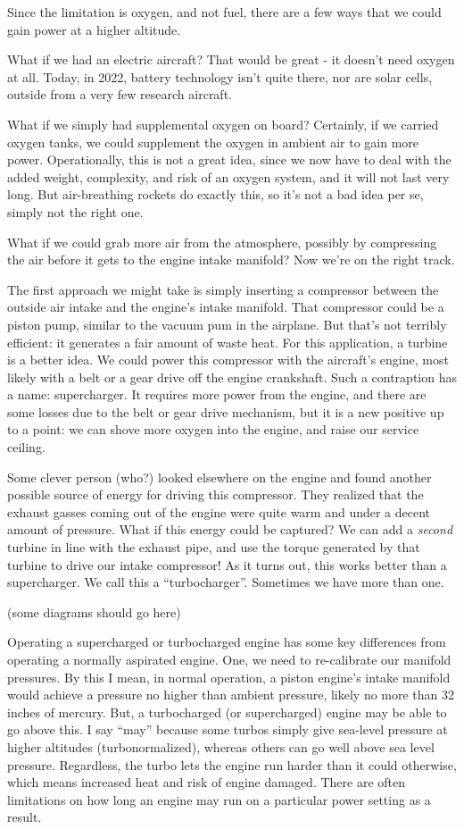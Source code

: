 Since the limitation is oxygen, and not fuel, there are a few ways that we could gain power at a higher altitude.

What if we had an electric aircraft? That would be great - it doesn't need oxygen at all. Today, in 2022, battery technology isn't quite there, nor are solar cells, outside from a very few research aircraft.

What if we simply had supplemental oxygen on board? Certainly, if we carried oxygen tanks, we could supplement the oxygen in ambient air to gain more power. Operationally, this is not a great idea, since we now have to deal with the added weight, complexity, and risk of an oxygen system, and it will not last very long. But air-breathing rockets do exactly this, so it's not a bad idea per se, simply not the right one.

What if we could grab more air from the atmosphere, possibly by compressing the air before it gets to the engine intake manifold? Now we're on the right track.

The first approach we might take is simply inserting a compressor between the outside air intake and the engine's intake manifold. That compressor could be a piston pump, similar to the vacuum pum in the airplane. But that's not terribly efficient: it generates a fair amount of waste heat. For this application, a turbine is a better idea. We could power this compressor with the aircraft's engine, most likely with a belt or a gear drive off the engine crankshaft. Such a contraption has a name: supercharger. It requires more power from the engine, and there are some losses due to the belt or gear drive mechanism, but it is a new positive up to a point: we can shove more oxygen into the engine, and raise our service ceiling.

Some clever person (who?) looked elsewhere on the engine and found another possible source of energy for driving this compressor. They realized that the exhaust gasses coming out of the engine were quite warm and under a decent amount of pressure. What if this energy could be captured? We can add a \emph{second} turbine in line with the exhaust pipe, and use the torque generated by that turbine to drive our intake compressor! As it turns out, this works better than a supercharger. We call this a ``turbocharger''. Sometimes we have more than one.

(some diagrams should go here)

Operating a supercharged or turbocharged engine has some key differences from operating a normally aspirated engine. One, we need to re-calibrate our manifold pressures. By this I mean, in normal operation, a piston engine's intake manifold would achieve a pressure no higher than ambient pressure, likely no more than 32 inches of mercury. But, a turbocharged (or supercharged) engine may be able to go above this. I say ``may'' because some turbos simply give sea-level pressure at higher altitudes (turbonormalized), whereas others can go well above sea level pressure. Regardless, the turbo lets the engine run harder than it could otherwise, which means increased heat and risk of engine damaged. There are often limitations on how long an engine may run on a particular power setting as a result.

